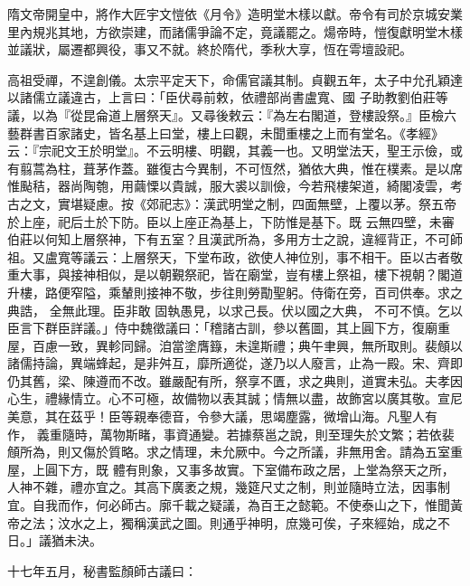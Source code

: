
\begin{pinyinscope}

 隋文帝開皇中，將作大匠宇文愷依《月令》造明堂木樣以獻。帝令有司於京城安業里內規兆其地，方欲崇建，而諸儒爭論不定，竟議罷之。煬帝時，愷復獻明堂木樣並議狀，屬遷都興役，事又不就。終於隋代，季秋大享，恆在雩壇設祀。



 高祖受禪，不遑創儀。太宗平定天下，命儒官議其制。貞觀五年，太子中允孔穎達以諸儒立議違古，上言曰：「臣伏尋前敕，依禮部尚書盧寬、國
 子助教劉伯莊等議，以為『從昆侖道上層祭天』。又尋後敕云：『為左右閣道，登樓設祭。』臣檢六藝群書百家諸史，皆名基上曰堂，樓上曰觀，未聞重樓之上而有堂名。《孝經》云：『宗祀文王於明堂』。不云明樓、明觀，其義一也。又明堂法天，聖王示儉，或有翦蒿為柱，葺茅作蓋。雖復古今異制，不可恆然，猶依大典，惟在樸素。是以席惟颭秸，器尚陶匏，用繭慄以貴誠，服大裘以訓儉，今若飛樓架道，綺閣凌雲，考古之文，實堪疑慮。按《郊祀志》：漢武明堂之制，四面無壁，上覆以茅。祭五帝於上座，祀后土於下防。臣以上座正為基上，下防惟是基下。既
 云無四壁，未審伯莊以何知上層祭神，下有五室？且漢武所為，多用方士之說，違經背正，不可師祖。又盧寬等議云：上層祭天，下堂布政，欲使人神位別，事不相干。臣以古者敬重大事，與接神相似，是以朝覲祭祀，皆在廟堂，豈有樓上祭祖，樓下視朝？閣道升樓，路便窄隘，乘輦則接神不敬，步往則勞勩聖躬。侍衛在旁，百司供奉。求之典誥，
 全無此理。臣非敢
 固執愚見，以求己長。伏以國之大典，
 不可不慎。乞以臣言下群臣詳議。」侍中魏徵議曰：「稽諸古訓，參以舊圖，其上圓下方，復廟重屋，百慮一致，異軫同歸。洎當塗膺籙，未遑斯禮；典午聿興，無所取則。裴頠以諸儒持論，異端蜂起，是非舛互，靡所適從，遂乃以人廢言，止為一殿。宋、齊即仍其舊，梁、陳遵而不改。雖嚴配有所，祭享不匱，求之典則，道實未弘。夫孝因心生，禮緣情立。心不可極，故備物以表其誠；情無以盡，故飾宮以廣其敬。宣尼美意，其在茲乎！臣等親奉德音，令參大議，思竭塵露，微增山海。凡聖人有
 作，
 義重隨時，萬物斯睹，事資通變。若據蔡邕之說，則至理失於文繁；若依裴頠所為，則又傷於質略。求之情理，未允厥中。今之所議，非無用舍。請為五室重屋，上圓下方，既
 體有則象，又事多故實。下室備布政之居，上堂為祭天之所，人神不雜，禮亦宜之。其高下廣袤之規，幾筵尺丈之制，則並隨時立法，因事制宜。自我而作，何必師古。廓千載之疑議，為百王之懿範。不使泰山之下，惟聞黃帝之法；汶水之上，獨稱漢武之圖。則通乎神明，庶幾可俟，子來經始，成之不日。」議猶未決。



 十七年五月，秘書監顏師古議曰：




\end{pinyinscope}
